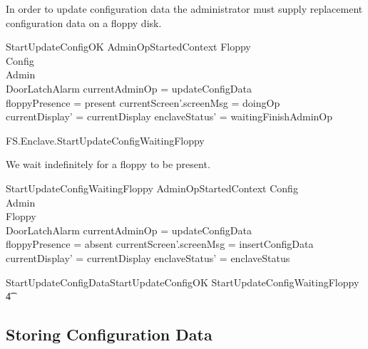 In order to update configuration data the administrator must supply
replacement configuration data on a floppy disk.


\begin{schema}{StartUpdateConfigOK}
        AdminOpStartedContext
\also   
        \Xi Floppy
\\      \Xi Config
\\      \Xi Admin     
\\      \Xi DoorLatchAlarm
\where
       \The currentAdminOp = updateConfigData
\\      floppyPresence = present
\also
        currentScreen'.screenMsg = doingOp
\\      currentDisplay' = currentDisplay
\also
        enclaveStatus' = waitingFinishAdminOp
\end{schema}

\begin{traceunit}{FS.Enclave.StartUpdateConfigWaitingFloppy}
\end{traceunit}


We wait indefinitely for a floppy to be present.

\begin{schema}{StartUpdateConfigWaitingFloppy}
        AdminOpStartedContext
\also   
        \Xi Config
\\      \Xi Admin 
\\      \Xi Floppy    
\\      \Xi DoorLatchAlarm
\where
        \The currentAdminOp = updateConfigData
\\      floppyPresence = absent
\also
        currentScreen'.screenMsg = insertConfigData
\\      currentDisplay' = currentDisplay
\also
        enclaveStatus' = enclaveStatus
\end{schema}

\begin{zed}
        StartUpdateConfigData StartUpdateConfigOK  
         \lor StartUpdateConfigWaitingFloppy
\\ \t4  \lor
        [~ BadAdminLogout | enclaveStatus = waitingStartAdminOp 
\\ \t6  \land \The currentAdminOp = updateConfigData      ~]
\end{zed}

\subsection{Storing Configuration Data}

